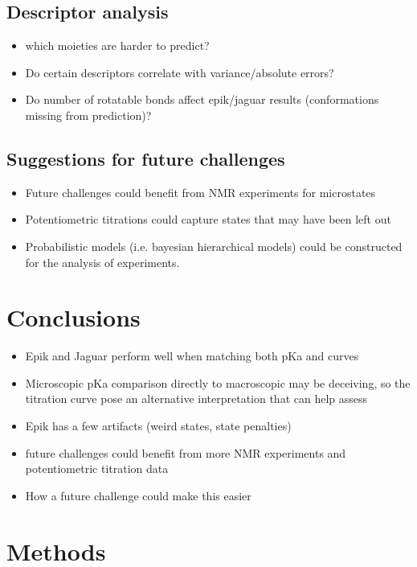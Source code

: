 \documentclass[9pt,lineno,final]{elife}
\begin{document}
\subsection{Descriptor analysis}
\begin{itemize}
	\item which moieties are harder to predict?
	\item Do certain descriptors correlate with variance/absolute errors?
	\item Do number of rotatable bonds affect epik/jaguar results (conformations missing from prediction)?
\end{itemize}


\subsection{Suggestions for future challenges}
\begin{itemize}
	\item Future challenges could benefit from NMR experiments for microstates
	\item Potentiometric titrations could capture states that may have been left out
	\item Probabilistic models (i.e. bayesian hierarchical models) could be constructed for the analysis of experiments. 
\end{itemize}

\section{Conclusions}

\begin{itemize}
	\item Epik and Jaguar perform well when matching both pKa and curves
	\item Microscopic pKa comparison directly to macroscopic may be deceiving, so the titration curve pose an alternative interpretation that can help assess
	\item Epik has a few artifacts (weird states, state penalties)
	\item future challenges could benefit from more NMR experiments and potentiometric titration data
	\item How a future challenge could make this easier
\end{itemize}


\section{Methods}
\end{document}
